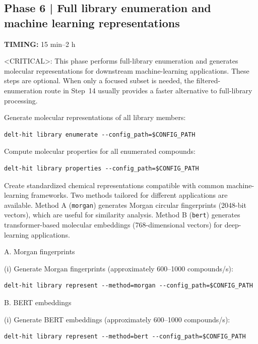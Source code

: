 


\subsection{Phase 6 | Full library enumeration and machine learning representations}

\textbf{TIMING:} 15 min--2 h

<CRITICAL>: This phase performs full-library enumeration and generates molecular representations for downstream machine-learning applications. These steps are optional. When only a focused subset is needed, the filtered-enumeration route in Step~14 usually provides a faster alternative to full-library processing.


Generate molecular representations of all library members: 

\begin{lstlisting}
delt-hit library enumerate --config_path=$CONFIG_PATH
\end{lstlisting}


Compute molecular properties for all enumerated compounds:

\begin{lstlisting}
delt-hit library properties --config_path=$CONFIG_PATH
\end{lstlisting}


Create standardized chemical representations compatible with common machine-learning frameworks. Two methods tailored for different applications are available. Method A (\texttt{morgan}) generates Morgan circular fingerprints (2048-bit vectors), which are useful for similarity analysis. Method B (\texttt{bert}) generates transformer-based molecular embeddings (768-dimensional vectors) for deep-learning applications.


A. Morgan fingerprints

(i) Generate Morgan fingerprints (approximately 600--1000 compounds/s):
\begin{lstlisting}
delt-hit library represent --method=morgan --config_path=$CONFIG_PATH
\end{lstlisting}

B. BERT embeddings

(i) Generate BERT embeddings (approximately 600--1000 compounds/s):
\begin{lstlisting}
delt-hit library represent --method=bert --config_path=$CONFIG_PATH
\end{lstlisting}
